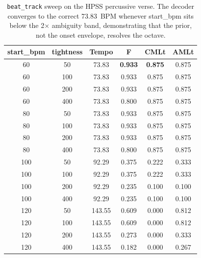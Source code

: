 \documentclass{article}
\begin{document}
\begin{table}[ht]
    \centering
    \caption{\texttt{beat\_track} sweep on the HPSS percussive verse. The decoder converges to the correct 73.83~BPM whenever start\_bpm sits below the 2$\times$ ambiguity band, demonstrating that the prior, not the onset envelope, resolves the octave.}
    \label{tab:prior}
    \begin{tabular}{cccccc}
        \toprule
        start\_bpm & tightness & Tempo  & F              & CMLt           & AMLt  \\
        \midrule
        60         & 50        & 73.83  & \textbf{0.933} & \textbf{0.875} & 0.875 \\
        60         & 100       & 73.83  & 0.933          & 0.875          & 0.875 \\
        60         & 200       & 73.83  & 0.933          & 0.875          & 0.875 \\
        60         & 400       & 73.83  & 0.800          & 0.875          & 0.875 \\
        80         & 50        & 73.83  & 0.933          & 0.875          & 0.875 \\
        80         & 100       & 73.83  & 0.933          & 0.875          & 0.875 \\
        80         & 200       & 73.83  & 0.933          & 0.875          & 0.875 \\
        80         & 400       & 73.83  & 0.800          & 0.875          & 0.875 \\
        100        & 50        & 92.29  & 0.375          & 0.222          & 0.333 \\
        100        & 100       & 92.29  & 0.375          & 0.222          & 0.333 \\
        100        & 200       & 92.29  & 0.235          & 0.100          & 0.100 \\
        100        & 400       & 92.29  & 0.235          & 0.100          & 0.100 \\
        120        & 50        & 143.55 & 0.609          & 0.000          & 0.812 \\
        120        & 100       & 143.55 & 0.609          & 0.000          & 0.812 \\
        120        & 200       & 143.55 & 0.273          & 0.000          & 0.333 \\
        120        & 400       & 143.55 & 0.182          & 0.000          & 0.267 \\
        \bottomrule
    \end{tabular}
\end{table}
\end{document}
